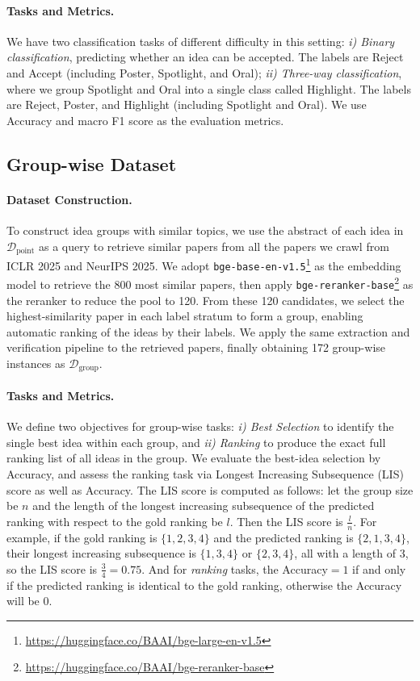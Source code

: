\paragraph{Tasks and Metrics.}
We have two classification tasks of different difficulty in this setting:
\textit{i) Binary classification}, predicting whether an idea can be accepted. The labels are Reject and Accept (including Poster, Spotlight, and Oral);
\textit{ii) Three-way classification}, where we group Spotlight and Oral into a single class called Highlight. The labels are Reject, Poster, and Highlight (including Spotlight and Oral).
We use Accuracy and macro F1 score as the evaluation metrics.

\subsection{Group-wise Dataset}
\paragraph{Dataset Construction.}
To construct idea groups with similar topics, we use the abstract of each idea in $\boldsymbol{\mathcal{D}}_\textrm{point}$ as a query to retrieve similar papers from all the papers we crawl from ICLR 2025 and NeurIPS 2025.
We adopt \texttt{bge-base-en-v1.5}\footnote{\url{https://huggingface.co/BAAI/bge-large-en-v1.5}} as the embedding model to retrieve the 800 most similar papers, then apply \texttt{bge-reranker-base}\footnote{\url{https://huggingface.co/BAAI/bge-reranker-base}} as the reranker to reduce the pool to 120.
From these 120 candidates, we select the highest-similarity paper in each label stratum to form a group, enabling automatic ranking of the ideas by their labels.
We apply the same extraction and verification pipeline to the retrieved papers, finally obtaining 172 group-wise instances as $\boldsymbol{\mathcal{D}}_\textrm{group}$.

\paragraph{Tasks and Metrics.}
We define two objectives for group-wise tasks:
\textit{i) Best Selection} to identify the single best idea within each group, and  
\textit{ii) Ranking} to produce the exact full ranking list of all ideas in the group.  
We evaluate the best-idea selection by Accuracy, and assess the ranking task via Longest Increasing Subsequence (LIS) score as well as Accuracy.
The LIS score is computed as follows: let the group size be $n$ and the length of the longest increasing subsequence of the predicted ranking with respect to the gold ranking be $l$.
Then the LIS score is $\frac{l}{n}$.
For example, if the gold ranking is $\{1, 2, 3, 4\}$ and the predicted ranking is $\{2, 1, 3, 4\}$, their longest increasing subsequence is $\{1, 3, 4\}$ or $\{2, 3, 4\}$, all with a length of 3, so the LIS score is $\frac{3}{4}=0.75$.
And for \textit{ranking} tasks, the Accuracy$=1$ if and only if the predicted ranking is identical to the gold ranking, otherwise the Accuracy will be $0$.

